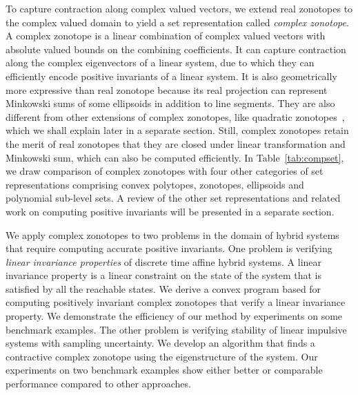 To capture contraction along complex valued vectors, we extend real
zonotopes to the complex valued domain to yield a set representation
called {\it complex zonotope}.  A complex zonotope is a linear
combination of complex valued vectors with absolute valued bounds on
the combining coefficients.  It can capture contraction along the
complex eigenvectors of a linear system, due to which they can
efficiently encode positive invariants of a linear system.  It is also
geometrically more expressive than real zonotope because its real
projection can represent Minkowski sums of some ellipsoids in addition
to line segments.  They are also different from other extensions of
complex zonotopes, like quadratic
zonotopes~\cite{DBLP:conf/aplas/AdjeGW15}, which we shall explain
later in a separate section.  Still, complex zonotopes retain the
merit of real zonotopes that they are closed under linear
transformation and Minkowski sum, which can also be computed
efficiently.  In Table~\ref{tab:compset}, we draw comparison of
complex zonotopes with four other categories of set representations
comprising convex polytopes, zonotopes, ellipsoids and polynomial
sub-level sets.  A review of the other set representations and related
work on computing positive invariants will be presented in a separate
section.

We apply complex zonotopes to two problems in the domain of hybrid
systems that require computing accurate positive invariants.  One
problem is verifying \emph{linear invariance properties} of discrete
time affine hybrid systems.  A linear invariance property is a linear
constraint on the state of the system that is satisfied by all the
reachable states.  We derive a convex program based for computing
positively invariant complex zonotopes that verify a linear invariance
property.  We demonstrate the efficiency of our method by experiments
on some benchmark examples.  The other problem is verifying stability
of linear impulsive systems with sampling uncertainty.  We develop an
algorithm that finds a contractive complex zonotope using the
eigenstructure of the system.  Our experiments on two benchmark
examples show either better or comparable performance compared to
other approaches.




